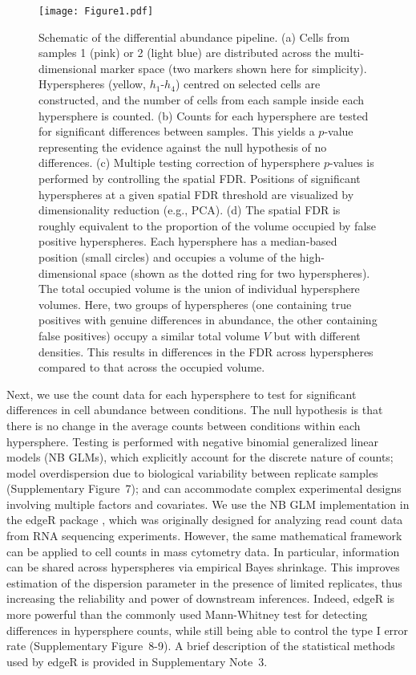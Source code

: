 \documentclass{article}
\newcommand{\suppsecedgeR}{3}
\newcommand{\suppfignbdisp}{7}
\newcommand{\suppfigedgeR}{8-9}
\begin{document}
\begin{figure}[btp]
    \begin{center}
        \texttt{[image: Figure1.pdf]}
    \end{center}
    \caption{Schematic of the differential abundance pipeline.
        (a) Cells from samples 1 (pink) or 2 (light blue) are distributed across the multi-dimensional marker space (two markers shown here for simplicity).
        Hyperspheres (yellow, $h_1$-$h_4$) centred on selected cells are constructed, and the number of cells from each sample inside each hypersphere is counted.
        (b) Counts for each hypersphere are tested for significant differences between samples.
        This yields a $p$-value representing the evidence against the null hypothesis of no differences.
        (c) Multiple testing correction of hypersphere $p$-values is performed by controlling the spatial FDR.
        Positions of significant hyperspheres at a given spatial FDR threshold are visualized by dimensionality reduction (e.g., PCA).
        (d) The spatial FDR is roughly equivalent to the proportion of the volume occupied by false positive hyperspheres.
    Each hypersphere has a median-based position (small circles) and occupies a volume of the high-dimensional space (shown as the dotted ring for two hyperspheres).
    The total occupied volume is the union of individual hypersphere volumes.
    Here, two groups of hyperspheres (one containing true positives with genuine differences in abundance, the other containing false positives) occupy a similar total volume $V$ but with different densities.
This results in differences in the FDR across hyperspheres compared to that across the occupied volume.
    }
    \label{fig:overview}
\end{figure}

Next, we use the count data for each hypersphere to test for significant differences in cell abundance between conditions.
The null hypothesis is that there is no change in the average counts between conditions within each hypersphere.
Testing is performed with negative binomial generalized linear models (NB GLMs), which explicitly account for the discrete nature of counts; model overdispersion due to biological variability between replicate samples (Supplementary Figure~\suppfignbdisp{}); and can accommodate complex experimental designs involving multiple factors and covariates.
We use the NB GLM implementation in the edgeR package \cite{mccarthy2012differential}, which was originally designed for analyzing read count data from RNA sequencing experiments.
However, the same mathematical framework can be applied to cell counts in mass cytometry data.
In particular, information can be shared across hyperspheres via empirical Bayes shrinkage.
This improves estimation of the dispersion parameter in the presence of limited replicates, thus increasing the reliability and power of downstream inferences.
Indeed, edgeR is more powerful than the commonly used Mann-Whitney test for detecting differences in hypersphere counts, while still being able to control the type I error rate (Supplementary Figure~\suppfigedgeR).
A brief description of the statistical methods used by edgeR is provided in Supplementary Note~\suppsecedgeR{}.
\end{document}
